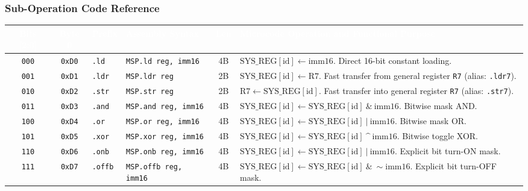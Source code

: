 \documentclass[11pt,a4paper]{article}
\begin{document}
\subsubsection*{Sub-Operation Code Reference}
\par\vspace{1mm}\noindent
\begin{minipage}{\textwidth}
\centering
\footnotesize
\begin{tabularx}{\textwidth}{@{} c c l l c >{\raggedright\arraybackslash}X @{}}
\toprule
\rowcolor{limslate}
\textcolor{white}{\textbf{Bits [2:0]}} & \textcolor{white}{\textbf{Byte 0}} & \textcolor{white}{\textbf{Prefix}} & \textcolor{white}{\textbf{Assembly Syntax}} & \textcolor{white}{\textbf{Len}} & \textcolor{white}{\textbf{Microcode Operation and Functional Purpose}} \\
\midrule
\rowcolors{2}{limroweven}{white}
\texttt{000} & \texttt{0xD0} & \texttt{.ld} & \texttt{MSP.ld reg, imm16} & 4B & \(\text{SYS\_REG}[\text{id}] \leftarrow \text{imm16}\). Direct 16-bit constant loading. \\
\texttt{001} & \texttt{0xD1} & \texttt{.ldr} & \texttt{MSP.ldr reg} & 2B & \(\text{SYS\_REG}[\text{id}] \leftarrow \text{R7}\). Fast transfer from general register \texttt{R7} (alias: \texttt{.ldr7}). \\
\texttt{010} & \texttt{0xD2} & \texttt{.str} & \texttt{MSP.str reg} & 2B & \(\text{R7} \leftarrow \text{SYS\_REG}[\text{id}]\). Fast transfer into general register \texttt{R7} (alias: \texttt{.str7}). \\
\texttt{011} & \texttt{0xD3} & \texttt{.and} & \texttt{MSP.and reg, imm16} & 4B & \(\text{SYS\_REG}[\text{id}] \leftarrow \text{SYS\_REG}[\text{id}] \ \& \ \text{imm16}\). Bitwise mask AND. \\
\texttt{100} & \texttt{0xD4} & \texttt{.or} & \texttt{MSP.or reg, imm16} & 4B & \(\text{SYS\_REG}[\text{id}] \leftarrow \text{SYS\_REG}[\text{id}] \ | \ \text{imm16}\). Bitwise mask OR. \\
\texttt{101} & \texttt{0xD5} & \texttt{.xor} & \texttt{MSP.xor reg, imm16} & 4B & \(\text{SYS\_REG}[\text{id}] \leftarrow \text{SYS\_REG}[\text{id}] \ \text{\textasciicircum} \ \text{imm16}\). Bitwise toggle XOR. \\
\texttt{110} & \texttt{0xD6} & \texttt{.onb} & \texttt{MSP.onb reg, imm16} & 4B & \(\text{SYS\_REG}[\text{id}] \leftarrow \text{SYS\_REG}[\text{id}] \ | \ \text{imm16}\). Explicit bit turn-ON mask. \\
\texttt{111} & \texttt{0xD7} & \texttt{.offb} & \texttt{MSP.offb reg, imm16} & 4B & \(\text{SYS\_REG}[\text{id}] \leftarrow \text{SYS\_REG}[\text{id}] \ \& \ \sim\text{imm16}\). Explicit bit turn-OFF mask. \\
\bottomrule
\end{tabularx}
\end{minipage}
\end{document}
